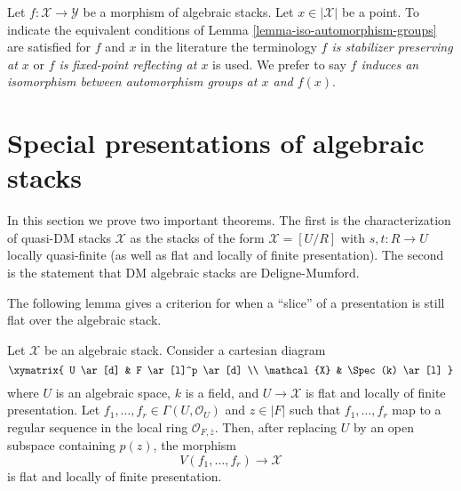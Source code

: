 \begin{remark}
\label{remark-identify-automorphism-groups}
Let $f : \mathcal{X} \to \mathcal{Y}$ be a morphism of algebraic stacks.
Let $x \in |\mathcal{X}|$ be a point. To indicate the equivalent
conditions of Lemma \ref{lemma-iso-automorphism-groups}
are satisfied for $f$ and $x$ in the literature the terminology
{\it $f$ is stabilizer preserving at $x$} or
{\it $f$ is fixed-point reflecting at $x$} is used.
We prefer to say {\it $f$ induces an isomorphism between
automorphism groups at $x$ and $f(x)$}.
\end{remark}




\section{Special presentations of algebraic stacks}
\label{section-presentations}

\noindent
In this section we prove two important theorems.
The first is the characterization of quasi-DM stacks $\mathcal{X}$
as the stacks of the form $\mathcal{X} = [U/R]$ with $s, t : R \to U$ locally
quasi-finite (as well as flat and locally of finite presentation).
The second is the statement that DM algebraic stacks are Deligne-Mumford.

\medskip\noindent
The following lemma gives a criterion for when a ``slice''
of a presentation is still flat over the algebraic stack.

\begin{lemma}
\label{lemma-slice}
Let $\mathcal{X}$ be an algebraic stack.
Consider a cartesian diagram
$$
\xymatrix{
U \ar[d] & F \ar[l]^p \ar[d] \\
\mathcal{X} & \Spec(k) \ar[l]
}
$$
where $U$ is an algebraic space, $k$ is a field, and $U \to \mathcal{X}$
is flat and locally of finite presentation. Let
$f_1, \ldots, f_r \in \Gamma(U, \mathcal{O}_U)$
and $z \in |F|$ such that $f_1, \ldots, f_r$ map to a regular sequence
in the local ring $\mathcal{O}_{F, \overline{z}}$.
Then, after replacing $U$ by an open subspace containing $p(z)$, the morphism
$$
V(f_1, \ldots, f_r) \longrightarrow \mathcal{X}
$$
is flat and locally of finite presentation.
\end{lemma}

